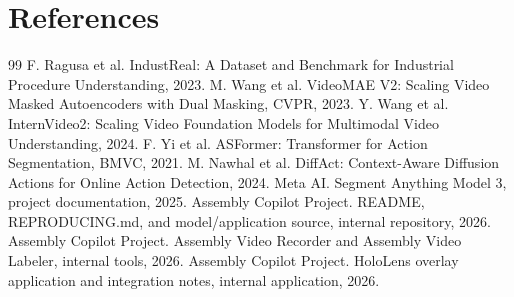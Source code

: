 \chapter*{References}

\begin{thebibliography}{99}
 F. Ragusa et al. IndustReal: A Dataset and Benchmark for Industrial Procedure Understanding, 2023.
 M. Wang et al. VideoMAE V2: Scaling Video Masked Autoencoders with Dual Masking, CVPR, 2023.
 Y. Wang et al. InternVideo2: Scaling Video Foundation Models for Multimodal Video Understanding, 2024.
 F. Yi et al. ASFormer: Transformer for Action Segmentation, BMVC, 2021.
 M. Nawhal et al. DiffAct: Context-Aware Diffusion Actions for Online Action Detection, 2024.
 Meta AI. Segment Anything Model 3, project documentation, 2025.
 Assembly Copilot Project. README, REPRODUCING.md, and model/application source, internal repository, 2026.
 Assembly Copilot Project. Assembly Video Recorder and Assembly Video Labeler, internal tools, 2026.
 Assembly Copilot Project. HoloLens overlay application and integration notes, internal application, 2026.
\end{thebibliography}
